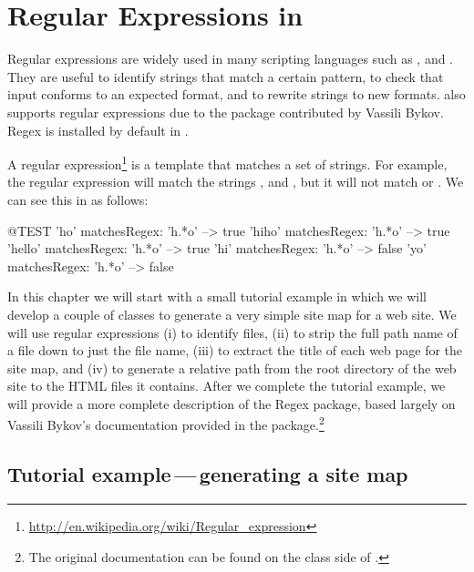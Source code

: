 \documentclass[a4paper,10pt,twoside]{book}
\begin{document}
\fi
\sloppy
\chapter{Regular Expressions in \pharo}

\chapterauthor{\authoroscar{}}

Regular expressions are widely used in many scripting languages such as ,  and .
They are useful to identify strings that match a certain pattern, to check that input conforms to an expected format, and to rewrite strings to new formats.
\pharo also supports regular expressions due to the  package contributed by Vassili Bykov. 
Regex is installed by default in \pharo.

A regular expression\footnote{\url{http://en.wikipedia.org/wiki/Regular_expression}} is a template that matches a set of strings.
For example, the regular expression  will match the strings ,  and , but it will not match  or .
We can see this in \pharo as follows:
\begin{code}{@TEST}
'ho' matchesRegex: 'h.*o'     --> true
'hiho' matchesRegex: 'h.*o'  --> true
'hello' matchesRegex: 'h.*o' --> true
'hi' matchesRegex: 'h.*o'      --> false
'yo' matchesRegex: 'h.*o'     --> false
\end{code}

In this chapter we will start with a small tutorial example in which we will develop a couple of classes to generate a very simple site map for a web site.
We will use regular expressions
(i) to identify  files,
(ii) to strip the full path name of a file down to just the file name,
(iii) to extract the title of each web page for the site map, and
(iv) to generate a relative path from the root directory of the web site to the HTML files it contains.
After we complete the tutorial example, we will provide a more complete description of the Regex package, based largely on Vassili Bykov's documentation provided in the package.\footnote{The original documentation can be found on the class side of .}

\section{Tutorial example\,---\,generating a site map}
\end{document}
